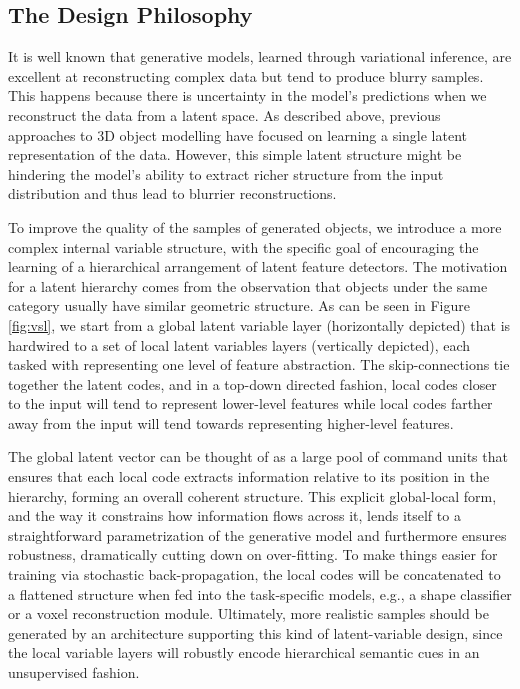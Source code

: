 \documentclass[10pt,twocolumn,letterpaper]{article}
\begin{document}
\subsection{The Design Philosophy}
\label{subsec: design}
It is well known that generative models, learned through variational inference, are excellent at reconstructing complex data but tend to produce blurry samples. This happens because there is uncertainty in the model's predictions when we reconstruct the data from a latent space. As described above, previous approaches to 3D object modelling have focused on learning a single latent representation of the data. However, this simple latent structure might be hindering the model's ability to extract richer structure from the input distribution and thus lead to blurrier reconstructions.

To improve the quality of the samples of generated objects, we introduce a more complex internal variable structure, with the specific goal of encouraging the learning of a hierarchical arrangement of latent feature detectors. The motivation for a latent hierarchy comes from the observation that objects under the same category usually have similar geometric structure. As can be seen in Figure \ref{fig:vsl}, we start from a global latent variable layer (horizontally depicted) that is hardwired to a set of local latent variables layers (vertically depicted), each tasked with representing one level of feature abstraction. The skip-connections tie together the latent codes, and in a top-down directed fashion, local codes closer to the input will tend to represent lower-level features while local codes farther away from the input will tend towards representing higher-level features.

The global latent vector can be thought of as a large pool of command units that ensures that each local code extracts information relative to its position in the hierarchy, forming an overall coherent structure. This explicit global-local form, and the way it constrains how information flows across it, lends itself to a straightforward parametrization of the generative model and furthermore ensures robustness, dramatically cutting down on over-fitting.
To make things easier for training via stochastic back-propagation, the local codes will be concatenated to a flattened structure when fed into the task-specific models, e.g., a shape classifier or a voxel reconstruction module.
Ultimately, more realistic samples should be generated by an architecture supporting this kind of latent-variable design, since the local variable layers will robustly encode hierarchical semantic cues in an unsupervised fashion.
\end{document}
